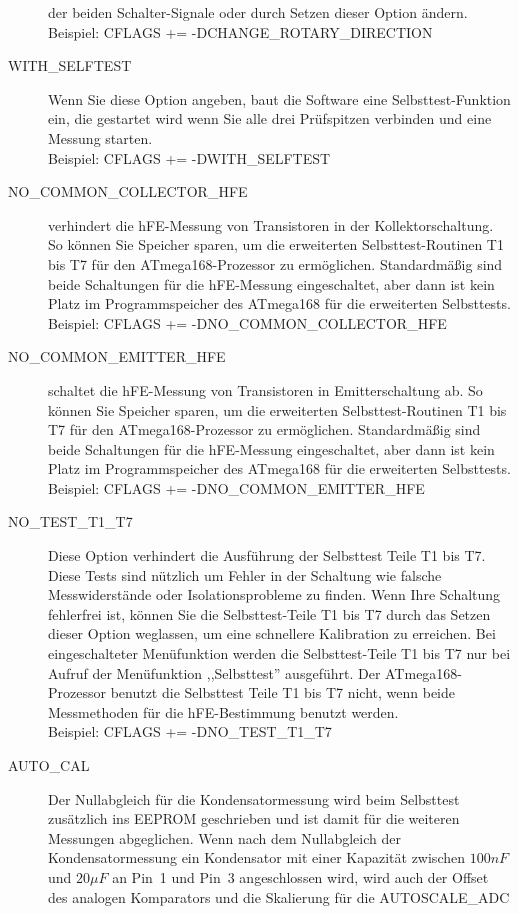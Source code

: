 \begin{description}
der beiden Schalter-Signale oder durch Setzen dieser Option ändern.
Beispiel: CFLAGS += -DCHANGE\_ROTARY\_DIRECTION
 \item[WITH\_SELFTEST] Wenn Sie diese Option angeben, baut die Software eine Selbsttest-Funktion ein, die gestartet wird
wenn Sie alle drei Prüfspitzen verbinden und eine Messung starten.\\
Beispiel: CFLAGS += -DWITH\_SELFTEST
  \item[NO\_COMMON\_COLLECTOR\_HFE] verhindert die hFE-Messung von Transistoren in der Kollektorschaltung.
So können Sie Speicher sparen, um die erweiterten Selbsttest-Routinen T1 bis T7 für den ATmega168-Prozessor zu ermöglichen.
Standardmäßig sind beide Schaltungen für die hFE-Messung eingeschaltet,
aber dann ist kein Platz im Programmspeicher des ATmega168 für die erweiterten Selbsttests.\\
Beispiel: CFLAGS += -DNO\_COMMON\_COLLECTOR\_HFE
  \item[NO\_COMMON\_EMITTER\_HFE] schaltet die hFE-Messung von Transistoren in Emitterschaltung ab.
So können Sie Speicher sparen, um die erweiterten Selbsttest-Routinen T1 bis T7 für den ATmega168-Prozessor zu ermöglichen.
Standardmäßig sind beide Schaltungen für die hFE-Messung eingeschaltet,
aber dann ist kein Platz im Programmspeicher des ATmega168 für die erweiterten Selbsttests.\\
Beispiel: CFLAGS += -DNO\_COMMON\_EMITTER\_HFE
  \item[NO\_TEST\_T1\_T7] Diese Option verhindert die Ausführung der Selbsttest Teile T1 bis T7.
Diese Tests sind nützlich um Fehler in der Schaltung wie falsche Messwiderstände oder Isolationsprobleme zu finden.
Wenn Ihre Schaltung fehlerfrei ist, können Sie die Selbsttest-Teile T1 bis T7 durch das Setzen dieser Option weglassen, um eine
schnellere Kalibration zu erreichen.
Bei eingeschalteter Menüfunktion werden die Selbsttest-Teile T1 bis T7 nur bei Aufruf der Menüfunktion ,,Selbsttest'' ausgeführt.
Der ATmega168-Prozessor benutzt die Selbsttest Teile T1 bis T7 nicht, wenn beide Messmethoden für die hFE-Bestimmung benutzt werden.\\
Beispiel: CFLAGS += -DNO\_TEST\_T1\_T7
  \item[AUTO\_CAL] Der Nullabgleich für die Kondensatormessung wird beim
Selbsttest zusätzlich ins EEPROM geschrieben und ist damit für die weiteren Messungen abgeglichen.
Wenn nach dem Nullabgleich der Kondensatormessung ein Kondensator mit einer Kapazität zwischen \(100 nF\) und \(20 \mu F\) an Pin~1 und Pin~3 
angeschlossen wird, wird auch der Offset des analogen Komparators und die Skalierung für die AUTOSCALE\_ADC

\end{description}
